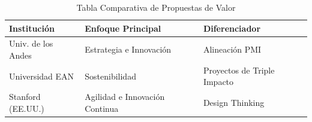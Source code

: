 \documentclass[10pt,a4paper]{article}
\begin{document}
	\begin{table}[H]
		\centering
		\begin{tabular}{p{4cm} p{6cm} p{4cm}}
			\hline
			\vspace{2mm}\textbf{Institución}\vspace{2mm} & \vspace{2mm}\textbf{Enfoque Principal}\vspace{2mm} & \vspace{2mm}\textbf{Diferenciador}\vspace{2mm}\\
			\hline
			\vspace{2mm}Univ. de los Andes\vspace{2mm} & \vspace{2mm}Estrategia e Innovación\vspace{2mm} & \vspace{2mm}Alineación PMI\vspace{2mm}\\
			\hline
			\vspace{2mm}Universidad EAN\vspace{2mm} & \vspace{2mm}Sostenibilidad\vspace{2mm} & \vspace{2mm}Proyectos de Triple Impacto\vspace{2mm}\\
			\hline
			\vspace{2mm}Stanford (EE.UU.)\vspace{2mm} & \vspace{2mm}Agilidad e Innovación Continua\vspace{2mm} & \vspace{2mm}Design Thinking\vspace{2mm}\\
			\hline
		\end{tabular}
		\caption{Tabla Comparativa de Propuestas de Valor}
		\label{tb: Tabla1}
	\end{table}
\end{document}
